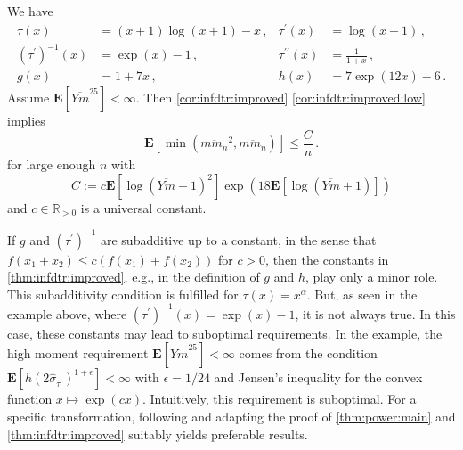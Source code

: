 \documentclass{article}
\newcommand{\R}{\mathbb{R}}
\newcommand{\Rpp}{\R_{>0}}
\newcommand{\lab}{\left[} %
\newcommand{\rab}{\right]} %
\newcommand{\ab}[1]{\lab #1 \rab} %
\newcommand{\abOf}[1]{\!\ab{#1}} %
\newcommand{\lb}{\left(} %
\newcommand{\rb}{\right)} %
\newcommand{\br}[1]{\lb #1 \rb} %
\newcommand{\brOf}[1]{\!\br{#1}} %
\newcommand{\E}{\mathbf{E}} %
\newcommand{\Eof}[1]{\E[#1]}
\newcommand{\EOf}[1]{\E\abOf{#1}}
\newcommand{\pr}{^\prime}
\newcommand{\prr}{^{\prime\prime}}
\newcommand{\eqcm}{\,,} %
\newcommand{\eqfs}{\,.}
\newcommand{\ol}[2]{\overline{#1#2}}
\newcommand{\tran}{\tau}
\newcommand{\dtran}{\tau\pr}
\newcommand{\ddtran}{\tau\prr}
\newcommand{\invdtran}{(\tau\pr)^{-1}}
\begin{document}
\begin{example}\label{exa:logp1}
    We have
    \begin{align}
        \tran(x) &= (x + 1) \log(x + 1) - x
        \eqcm
        &\dtran(x) &= \log(x + 1)
        \eqcm\\
        \invdtran(x) &= \exp(x)-1
        \eqcm
        &\ddtran(x) &= \frac{1}{1+x}
        \eqcm\\
        g(x) &= 1 + 7 x
        \eqcm
        &h(x) &= 7\exp(12 x) - 6
        \eqfs
    \end{align}
    Assume $\Eof{\ol {Y}m^{25}} < \infty$.
    Then \cref{cor:infdtr:improved} \ref{cor:infdtr:improved:low} implies
    \begin{equation}
        \EOf{\min\brOf{\ol m{m_n}^2, \ol m{m_n}}}
        \leq
        \frac{C}{n}
        \eqfs
    \end{equation}
    for large enough $n$ with
    \begin{equation}
        C := c \EOf{\log(\ol Ym + 1)^2} \exp\brOf{18 \EOf{\log(\ol Ym + 1)}}
    \end{equation}
    and $c\in\Rpp$ is a universal constant.
\end{example}
%
\begin{remark}
    If $g$ and $\invdtran$ are subadditive up to a constant, in the sense that $f(x_1 + x_2) \leq c (f(x_1) + f(x_2))$ for $c>0$, then the constants in \cref{thm:infdtr:improved}, e.g., in the definition of $g$ and $h$, play only a minor role. This subadditivity condition is fulfilled for $\tran(x) = x^\alpha$. But, as seen in the example above, where $\invdtran(x) = \exp(x)-1$, it is not always true. In this case, these constants may lead to suboptimal requirements. In the example, the high moment requirement $\Eof{\ol {Y}m^{25}} < \infty$ comes from the condition $\Eof{ h(2\hat\sigma_{\dtran})^{1+\epsilon}} < \infty$ with $\epsilon = 1/24$ and Jensen's inequality for the convex function $x\mapsto \exp(cx)$. Intuitively, this requirement is suboptimal. For a specific transformation, following and adapting the proof of \cref{thm:power:main} and \cref{thm:infdtr:improved} suitably yields preferable results.
\end{remark}
%
\end{document}
